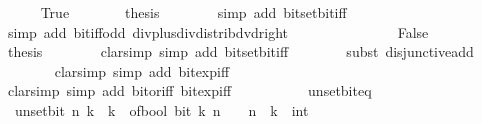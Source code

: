 \begin{isabellebody}
\ \ \ \ \isamarkupfalse%
\ True\isanewline
\ \ \ \ \isamarkupfalse%
\ \isamarkupfalse%
\ {\isacharquery}{\kern0pt}thesis\isanewline
\ \ \ \ \ \ \isamarkupfalse%
\ {\isacharparenleft}{\kern0pt}simp\ add{\isacharcolon}{\kern0pt}\ bit{\isacharunderscore}{\kern0pt}set{\isacharunderscore}{\kern0pt}bit{\isacharunderscore}{\kern0pt}iff{\isacharparenright}{\kern0pt}\isanewline
\ \ \ \ \ \ \isamarkupfalse%
\ {\isacharparenleft}{\kern0pt}simp\ add{\isacharcolon}{\kern0pt}\ bit{\isacharunderscore}{\kern0pt}iff{\isacharunderscore}{\kern0pt}odd\ div{\isacharunderscore}{\kern0pt}plus{\isacharunderscore}{\kern0pt}div{\isacharunderscore}{\kern0pt}distrib{\isacharunderscore}{\kern0pt}dvd{\isacharunderscore}{\kern0pt}right{\isacharparenright}{\kern0pt}\isanewline
\ \ \ \ \ \ \isamarkupfalse%
\isanewline
\ \ \isamarkupfalse%
\isanewline
\ \ \ \ \isamarkupfalse%
\ False\isanewline
\ \ \ \ \isamarkupfalse%
\ \isamarkupfalse%
\ {\isacharquery}{\kern0pt}thesis\isanewline
\ \ \ \ \ \ \isamarkupfalse%
\ {\isacharparenleft}{\kern0pt}clarsimp\ simp\ add{\isacharcolon}{\kern0pt}\ bit{\isacharunderscore}{\kern0pt}set{\isacharunderscore}{\kern0pt}bit{\isacharunderscore}{\kern0pt}iff{\isacharparenright}{\kern0pt}\isanewline
\ \ \ \ \ \ \isamarkupfalse%
\ {\isacharparenleft}{\kern0pt}subst\ disjunctive{\isacharunderscore}{\kern0pt}add{\isacharparenright}{\kern0pt}\isanewline
\ \ \ \ \ \ \isamarkupfalse%
\ {\isacharparenleft}{\kern0pt}clarsimp\ simp\ add{\isacharcolon}{\kern0pt}\ bit{\isacharunderscore}{\kern0pt}exp{\isacharunderscore}{\kern0pt}iff{\isacharparenright}{\kern0pt}\isanewline
\ \ \ \ \ \ \isamarkupfalse%
\ {\isacharparenleft}{\kern0pt}clarsimp\ simp\ add{\isacharcolon}{\kern0pt}\ bit{\isacharunderscore}{\kern0pt}or{\isacharunderscore}{\kern0pt}iff\ bit{\isacharunderscore}{\kern0pt}exp{\isacharunderscore}{\kern0pt}iff{\isacharparenright}{\kern0pt}\isanewline
\ \ \ \ \ \ \isamarkupfalse%
\isanewline
\ \ \isamarkupfalse%
\isanewline
{}\isamarkupfalse%
%
\endisatagproof
{\isafoldproof}%
%
\isadelimproof
\isanewline
%
\endisadelimproof
\isanewline
{}\isamarkupfalse%
\ unset{\isacharunderscore}{\kern0pt}bit{\isacharunderscore}{\kern0pt}eq{\isacharcolon}{\kern0pt}\isanewline
\ \ {\isacartoucheopen}unset{\isacharunderscore}{\kern0pt}bit\ n\ k\ {\isacharequal}{\kern0pt}\ k\ {\isacharminus}{\kern0pt}\ of{\isacharunderscore}{\kern0pt}bool\ {\isacharparenleft}{\kern0pt}bit\ k\ n{\isacharparenright}{\kern0pt}\ {\isacharasterisk}{\kern0pt}\ {}\ {\isacharcircum}{\kern0pt}\ n{\isacartoucheclose}\ \ k\ {\isacharcolon}{\kern0pt}{\isacharcolon}{\kern0pt}\ int\isanewline

\end{isabellebody}
